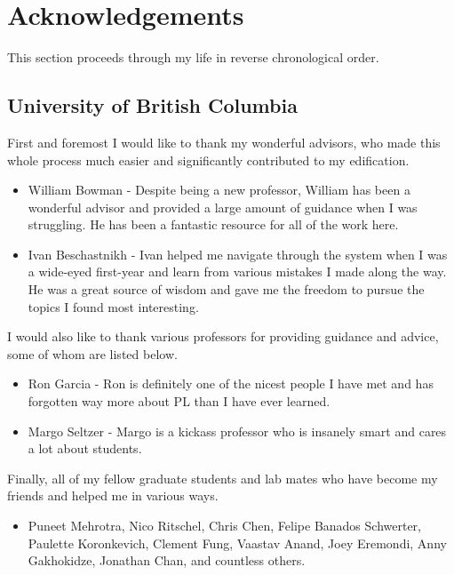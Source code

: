 \chapter{Acknowledgements}
This section proceeds through my life in reverse chronological order.

\section*{University of British Columbia}
First and foremost I would like to thank my wonderful advisors, who made this whole process much easier and significantly contributed to my edification.
\begin{itemize}
    \item William Bowman - Despite being a new professor, William has been a wonderful advisor and provided a large amount of guidance when I was struggling.
    He has been a fantastic resource for all of the work here.
    \item Ivan Beschastnikh - Ivan helped me navigate through the system when I was a wide-eyed first-year and learn from various mistakes I made along the way.
    He was a great source of wisdom and gave me the freedom to pursue the topics I found most interesting.
\end{itemize}

I would also like to thank various professors for providing guidance and advice, some of whom are listed below.
\begin{itemize}
    \item Ron Garcia - Ron is definitely one of the nicest people I have met and has forgotten way more about PL than I have ever learned.
    \item Margo Seltzer - Margo is a kickass professor who is insanely smart and cares a lot about students.
\end{itemize}

Finally, all of my fellow graduate students and lab mates who have become my friends and helped me in various ways.
\begin{itemize}
    \item Puneet Mehrotra, Nico Ritschel, Chris Chen, Felipe Banados Schwerter, Paulette Koronkevich, Clement Fung, Vaastav Anand, Joey Eremondi, Anny Gakhokidze, Jonathan Chan, and countless others.
\end{itemize}

